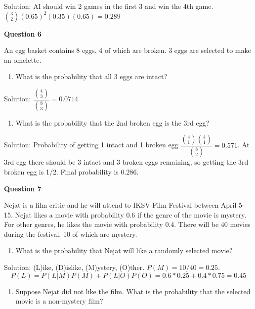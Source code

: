 \documentclass[]{book}
\providecommand{\tightlist}{%
  \setlength{\itemsep}{0pt}\setlength{\parskip}{0pt}}
\theoremstyle{definition}
\theoremstyle{definition}
\theoremstyle{definition}
\theoremstyle{remark}
\begin{document}
Solution: AI should win 2 games in the first 3 and win the 4th game.
\(\binom{3}{2}(0.65)^2(0.35)(0.65) = 0.289\)

\textbf{Question 6}

An egg basket contains 8 eggs, 4 of which are broken. 3 eggs are
selected to make an omelette.

\begin{enumerate}
\def\labelenumi{\alph{enumi})}
\tightlist
\item
  What is the probability that all 3 eggs are intact?
\end{enumerate}

Solution: \(\dfrac{\binom{4}{3}}{\binom{8}{3}} = 0.0714\)

\begin{enumerate}
\def\labelenumi{\alph{enumi})}
\setcounter{enumi}{1}
\tightlist
\item
  What is the probability that the 2nd broken egg is the 3rd egg?
\end{enumerate}

Solution: Probability of getting 1 intact and 1 broken egg
\(\dfrac{\binom{4}{1}\binom{4}{1}}{\binom{8}{2}} = 0.571\). At 3rd egg
there should be 3 intact and 3 broken eggs remaining, so getting the 3rd
broken egg is 1/2. Final probability is \(0.286\).

\textbf{Question 7}

Nejat is a film critic and he will attend to IKSV Film Festival between
April 5-15. Nejat likes a movie with probability 0.6 if the genre of the
movie is mystery. For other genres, he likes the movie with probability
0.4. There will be 40 movies during the festival, 10 of which are
mystery.

\begin{enumerate}
\def\labelenumi{\alph{enumi})}
\tightlist
\item
  What is the probability that Nejat will like a randomly selected
  movie?
\end{enumerate}

Solution: (L)ike, (D)islike, (M)ystery, (O)ther.
\(P(M) = 10/40 = 0.25\).
\[P(L) = P(L|M)P(M) + P(L|O)P(O) = 0.6*0.25 + 0.4*0.75 = 0.45\]

\begin{enumerate}
\def\labelenumi{\alph{enumi})}
\setcounter{enumi}{1}
\tightlist
\item
  Suppose Nejat did not like the film. What is the probability that the
  selected movie is a non-mystery film?
\end{enumerate}
\end{document}
